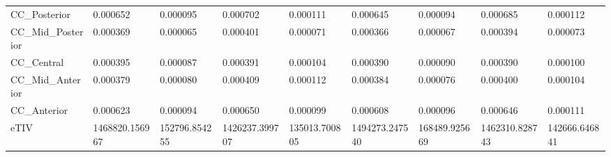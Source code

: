 \begin{tabular}{lllllllll}
CC_Posterior & 0.000652 & 0.000095 & 0.000702 & 0.000111 & 0.000645 & 0.000094 & 0.000685 & 0.000112 \\
CC_Mid_Posterior & 0.000369 & 0.000065 & 0.000401 & 0.000071 & 0.000366 & 0.000067 & 0.000394 & 0.000073 \\
CC_Central & 0.000395 & 0.000087 & 0.000391 & 0.000104 & 0.000390 & 0.000090 & 0.000390 & 0.000100 \\
CC_Mid_Anterior & 0.000379 & 0.000080 & 0.000409 & 0.000112 & 0.000384 & 0.000076 & 0.000400 & 0.000104 \\
CC_Anterior & 0.000623 & 0.000094 & 0.000650 & 0.000099 & 0.000608 & 0.000096 & 0.000646 & 0.000111 \\
eTIV & 1468820.156967 & 152796.854255 & 1426237.399707 & 135013.700805 & 1494273.247540 & 168489.925669 & 1462310.828743 & 142666.646841 \\
\bottomrule
\end{tabular}
